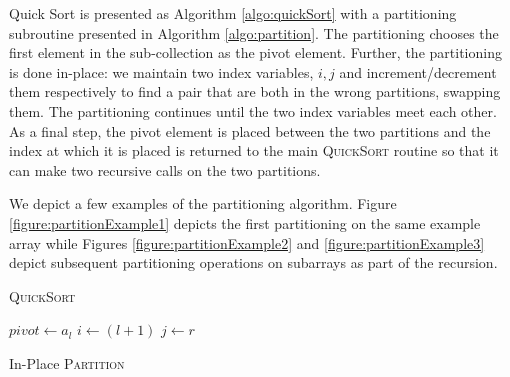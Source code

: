 Quick Sort is presented as Algorithm \ref{algo:quickSort} with a 
partitioning subroutine presented in Algorithm \ref{algo:partition}.  
The partitioning chooses the first element in the sub-collection as
the pivot element.  Further, the partitioning is done in-place: we
maintain two index variables, $i, j$ and increment/decrement them 
respectively to find a pair that are both in the wrong partitions, 
swapping them.  The partitioning continues until the two index 
variables meet each other.  As a final step, the pivot element
is placed between the two partitions and the index at which it is
placed is returned to the main \textsc{QuickSort} routine so that
it can make two recursive calls on the two partitions.

We depict a few examples of the partitioning algorithm.  Figure 
\ref{figure:partitionExample1} depicts the first partitioning on the
same example array while Figures \ref{figure:partitionExample2} and
\ref{figure:partitionExample3} depict subsequent partitioning operations
on subarrays as part of the recursion.

\begin{algorithm}[H]
\caption{\textsc{QuickSort}}
\label{algo:quickSort}
\end{algorithm}

\begin{algorithm}[H]
  $pivot \leftarrow a_l$ \; 
  $i \leftarrow (l+1)$ \;
  $j \leftarrow r$ \;
\caption{In-Place \textsc{Partition}}
\label{algo:partition}
\end{algorithm}

